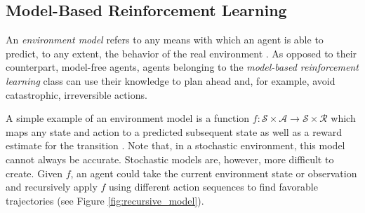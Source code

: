 \subsection{Model-Based Reinforcement Learning}
An \textit{environment model} refers to any means with which an agent is able to predict, to any extent, the behavior of the real environment \cite{bible}. As opposed to their counterpart, model-free agents, agents belonging to the \textit{model-based reinforcement learning} class can use their knowledge to plan ahead and, for example, avoid catastrophic, irreversible actions.

A simple example of an environment model is a function $f : \mathscr{S} \times \mathscr{A} \to \mathscr{S} \times \mathscr{R}$ which maps any state and action to a predicted subsequent state as well as a reward estimate for the transition \cite{model}. Note that, in a stochastic environment, this model cannot always be accurate. Stochastic models are, however, more difficult to create. Given $f$, an agent could take the current environment state or observation and recursively apply $f$ using different action sequences to find favorable trajectories (see Figure \ref{fig:recursive_model}).
